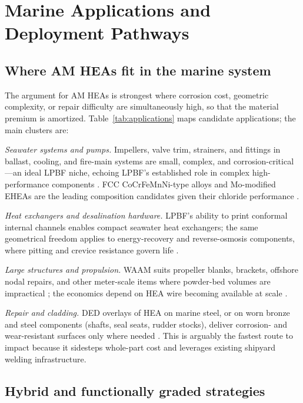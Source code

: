 \section{Marine Applications and Deployment Pathways}
\label{sec:applications}

\subsection{Where AM HEAs fit in the marine system}

The argument for AM HEAs is strongest where corrosion cost, geometric complexity, or repair difficulty are simultaneously high, so that the material premium is amortized. Table~\ref{tab:applications} maps candidate applications; the main clusters are:

\emph{Seawater systems and pumps.} Impellers, valve trim, strainers, and fittings in ballast, cooling, and fire-main systems are small, complex, and corrosion-critical---an ideal LPBF niche, echoing LPBF's established role in complex high-performance components \cite{cagirici2024}. FCC CoCrFeMnNi-type alloys and Mo-modified EHEAs are the leading composition candidates given their chloride performance \cite{lpbf_cantor_2024,mo_ehea_2026}.

\emph{Heat exchangers and desalination hardware.} LPBF's ability to print conformal internal channels enables compact seawater heat exchangers; the same geometrical freedom applies to energy-recovery and reverse-osmosis components, where pitting and crevice resistance govern life \cite{cagirici2024,nass2025marine}.

\emph{Large structures and propulsion.} WAAM suits propeller blanks, brackets, offshore nodal repairs, and other meter-scale items where powder-bed volumes are impractical \cite{raultaiwade2021}; the economics depend on HEA wire becoming available at scale \cite{andersson2026waam}.

\emph{Repair and cladding.} DED overlays of HEA on marine steel, or on worn bronze and steel components (shafts, seal seats, rudder stocks), deliver corrosion- and wear-resistant surfaces only where needed \cite{jiang2019clad}. This is arguably the fastest route to impact because it sidesteps whole-part cost and leverages existing shipyard welding infrastructure.

\subsection{Hybrid and functionally graded strategies}

